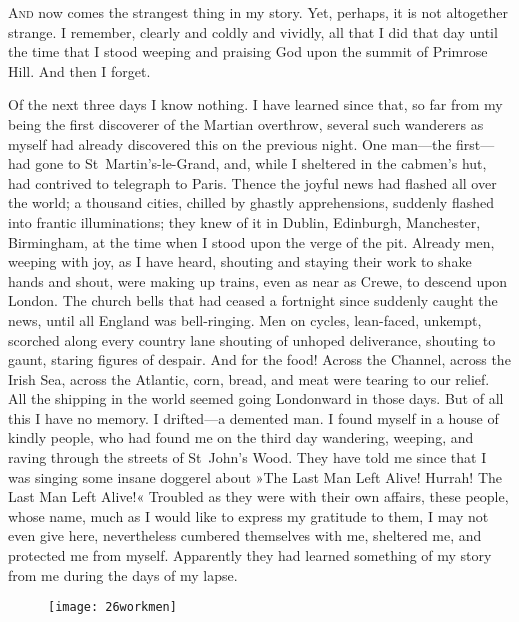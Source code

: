 

\lettrine[lines=4,findent=2pt]{A}{nd} now comes the strangest thing in my story. Yet, perhaps, it is not altogether strange. I remember, clearly and coldly and vividly, all that I did that day until the time that I stood weeping and praising God upon the summit of Primrose Hill. And then I forget.

Of the next three days I know nothing. I have learned since that, so far from my being the first discoverer of the Martian overthrow, several such wanderers as myself had already discovered this on the previous night. One man—the first—had gone to St~Martin's-le-Grand, and, while I sheltered in the cabmen's hut, had contrived to telegraph to Paris. Thence the joyful news had flashed all over the world; a thousand cities, chilled by ghastly apprehensions, suddenly flashed into frantic illuminations; they knew of it in Dublin, Edinburgh, Manchester, Birmingham, at the time when I stood upon the verge of the pit. Already men, weeping with joy, as I have heard, shouting and staying their work to shake hands and shout, were making up trains, even as near as Crewe, to descend upon London. The church bells that had ceased a fortnight since suddenly caught the news, until all England was bell-ringing. Men on cycles, lean-faced, unkempt, scorched along every country lane shouting of unhoped deliverance, shouting to gaunt, staring figures of despair. And for the food! Across the Channel, across the Irish Sea, across the Atlantic, corn, bread, and meat were tearing to our relief. All the shipping in the world seemed going Londonward in those days. But of all this I have no memory. I drifted—a demented man. I found myself in a house of kindly people, who had found me on the third day wandering, weeping, and raving through the streets of St~John's Wood. They have told me since that I was singing some insane doggerel about »The Last Man Left Alive! Hurrah! The Last Man Left Alive!« Troubled as they were with their own affairs, these people, whose name, much as I would like to express my gratitude to them, I may not even give here, nevertheless cumbered themselves with me, sheltered me, and protected me from myself. Apparently they had learned something of my story from me during the days of my lapse.

\begin{figure}[tb]
\centering
\texttt{[image: 26workmen]}
\end{figure}

